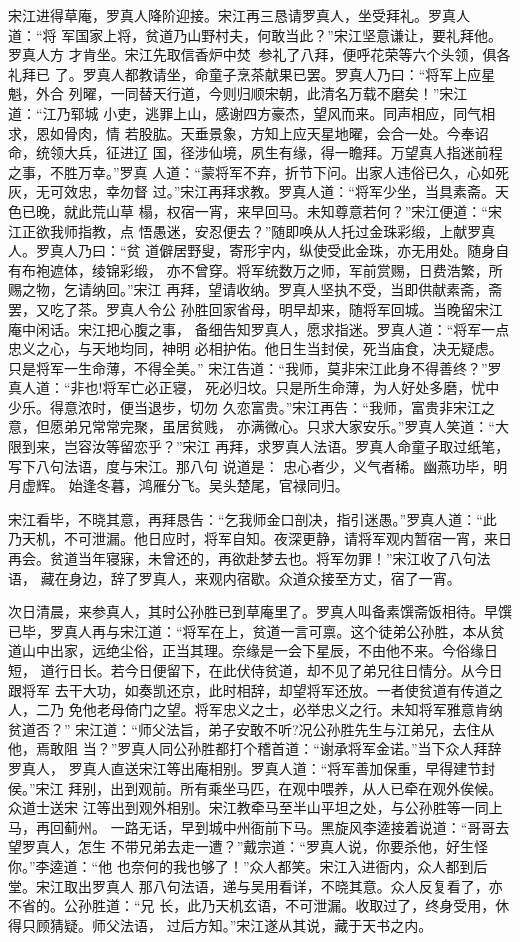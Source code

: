 宋江进得草庵，罗真人降阶迎接。宋江再三恳请罗真人，坐受拜礼。罗真人道：“将
军国家上将，贫道乃山野村夫，何敢当此？”宋江坚意谦让，要礼拜他。罗真人方
才肯坐。宋江先取信香炉中焚，参礼了八拜，便呼花荣等六个头领，俱各礼拜已
了。罗真人都教请坐，命童子烹茶献果已罢。罗真人乃曰：“将军上应星魁，外合
列曜，一同替天行道，今则归顺宋朝，此清名万载不磨矣！”宋江道：“江乃郓城
小吏，逃罪上山，感谢四方豪杰，望风而来。同声相应，同气相求，恩如骨肉，情
若股肱。天垂景象，方知上应天星地曜，会合一处。今奉诏命，统领大兵，征进辽
国，径涉仙境，夙生有缘，得一瞻拜。万望真人指迷前程之事，不胜万幸。”罗真
人道：“蒙将军不弃，折节下问。出家人违俗已久，心如死灰，无可效忠，幸勿督
过。”宋江再拜求教。罗真人道：“将军少坐，当具素斋。天色已晚，就此荒山草
榻，权宿一宵，来早回马。未知尊意若何？”宋江便道：“宋江正欲我师指教，点
悟愚迷，安忍便去？”随即唤从人托过金珠彩缎，上献罗真人。罗真人乃曰：“贫
道僻居野叟，寄形宇内，纵使受此金珠，亦无用处。随身自有布袍遮体，绫锦彩缎，
亦不曾穿。将军统数万之师，军前赏赐，日费浩繁，所赐之物，乞请纳回。”宋江
再拜，望请收纳。罗真人坚执不受，当即供献素斋，斋罢，又吃了茶。罗真人令公
孙胜回家省母，明早却来，随将军回城。当晚留宋江庵中闲话。宋江把心腹之事，
备细告知罗真人，愿求指迷。罗真人道：“将军一点忠义之心，与天地均同，神明
必相护佑。他日生当封侯，死当庙食，决无疑虑。只是将军一生命薄，不得全美。”
宋江告道：“我师，莫非宋江此身不得善终？”罗真人道：“非也!将军亡必正寝，
死必归坟。只是所生命薄，为人好处多磨，忧中少乐。得意浓时，便当退步，切勿
久恋富贵。”宋江再告：“我师，富贵非宋江之意，但愿弟兄常常完聚，虽居贫贱，
亦满微心。只求大家安乐。”罗真人笑道：“大限到来，岂容汝等留恋乎？”宋江
再拜，求罗真人法语。罗真人命童子取过纸笔，写下八句法语，度与宋江。那八句
说道是：
忠心者少，义气者稀。幽燕功毕，明月虚辉。
始逢冬暮，鸿雁分飞。吴头楚尾，官禄同归。

宋江看毕，不晓其意，再拜恳告：“乞我师金口剖决，指引迷愚。”罗真人道：“此
乃天机，不可泄漏。他日应时，将军自知。夜深更静，请将军观内暂宿一宵，来日
再会。贫道当年寝寐，未曾还的，再欲赴梦去也。将军勿罪！”宋江收了八句法语，
藏在身边，辞了罗真人，来观内宿歇。众道众接至方丈，宿了一宵。

次日清晨，来参真人，其时公孙胜已到草庵里了。罗真人叫备素馔斋饭相待。早馔
已毕，罗真人再与宋江道：“将军在上，贫道一言可禀。这个徒弟公孙胜，本从贫
道山中出家，远绝尘俗，正当其理。奈缘是一会下星辰，不由他不来。今俗缘日短，
道行日长。若今日便留下，在此伏侍贫道，却不见了弟兄往日情分。从今日跟将军
去干大功，如奏凯还京，此时相辞，却望将军还放。一者使贫道有传道之人，二乃
免他老母倚门之望。将军忠义之士，必举忠义之行。未知将军雅意肯纳贫道否？”
宋江道：“师父法旨，弟子安敢不听?况公孙胜先生与江弟兄，去住从他，焉敢阻
当？”罗真人同公孙胜都打个稽首道：“谢承将军金诺。”当下众人拜辞罗真人，
罗真人直送宋江等出庵相别。罗真人道：“将军善加保重，早得建节封侯。”宋江
拜别，出到观前。所有乘坐马匹，在观中喂养，从人已牵在观外俟候。众道士送宋
江等出到观外相别。宋江教牵马至半山平坦之处，与公孙胜等一同上马，再回蓟州。
一路无话，早到城中州衙前下马。黑旋风李逵接着说道：“哥哥去望罗真人，怎生
不带兄弟去走一遭？”戴宗道：“罗真人说，你要杀他，好生怪你。”李逵道：“他
也奈何的我也够了！”众人都笑。宋江入进衙内，众人都到后堂。宋江取出罗真人
那八句法语，递与吴用看详，不晓其意。众人反复看了，亦不省的。公孙胜道：“兄
长，此乃天机玄语，不可泄漏。收取过了，终身受用，休得只顾猜疑。师父法语，
过后方知。”宋江遂从其说，藏于天书之内。

